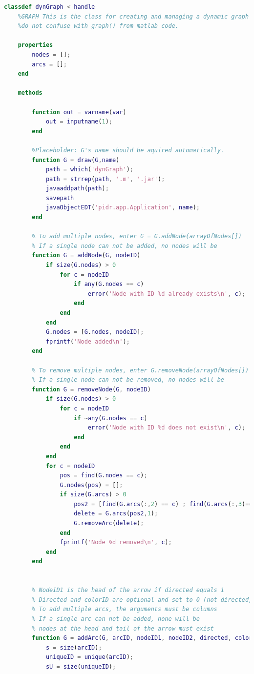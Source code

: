 \documentclass[pidr]{tnreport}
\begin{document}
\begin{lstlisting}[language=matlab, caption={dynGraph.m}, label={lst:dynGraph_m}]
classdef dynGraph < handle
    %GRAPH This is the class for creating and managing a dynamic graph editor for Matlab 
    %do not confuse with graph() from matlab code.
    
    properties
        nodes = [];
        arcs = [];
    end
    
    methods
        
        function out = varname(var)
            out = inputname(1);
        end
        
        %Placeholder: G's name should be aquired automatically.
        function G = draw(G,name)
            path = which('dynGraph');
            path = strrep(path, '.m', '.jar');
            javaaddpath(path);
            savepath
            javaObjectEDT('pidr.app.Application', name);
        end
        
        % To add multiple nodes, enter G = G.addNode(arrayOfNodes[])
        % If a single node can not be added, no nodes will be
        function G = addNode(G, nodeID)
            if size(G.nodes) > 0
                for c = nodeID 
                    if any(G.nodes == c)
                        error('Node with ID %d already exists\n', c);
                    end
                end
            end
            G.nodes = [G.nodes, nodeID];
            fprintf('Node added\n');
        end
        
        % To remove multiple nodes, enter G.removeNode(arrayOfNodes[])
        % If a single node can not be removed, no nodes will be
        function G = removeNode(G, nodeID)
            if size(G.nodes) > 0
                for c = nodeID 
                    if ~any(G.nodes == c)
                        error('Node with ID %d does not exist\n', c);
                    end
                end
            end
            for c = nodeID
                pos = find(G.nodes == c);
                G.nodes(pos) = [];
                if size(G.arcs) > 0
                    pos2 = [find(G.arcs(:,2) == c) ; find(G.arcs(:,3)== c)];
                    delete = G.arcs(pos2,1);
                    G.removeArc(delete);
                end
                fprintf('Node %d removed\n', c);
            end
        end
  
        
        % NodeID1 is the head of the arrow if directed equals 1
        % Directed and colorID are optional and set to 0 (not directed, black) by default
        % To add multiple arcs, the arguments must be columns
        % If a single arc can not be added, none will be
        % nodes at the head and tail of the arrow must exist
        function G = addArc(G, arcID, nodeID1, nodeID2, directed, colorID)
            s = size(arcID);
            uniqueID = unique(arcID);
            sU = size(uniqueID);
            

\end{lstlisting}
\end{document}
